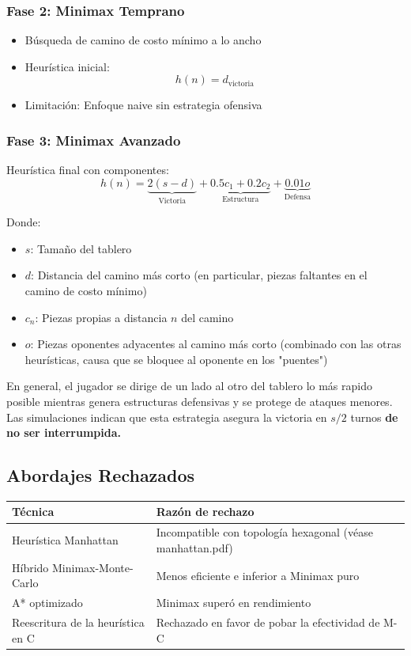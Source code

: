 \documentclass{article}
\begin{document}
\subsubsection*{Fase 2: Minimax Temprano}
\begin{itemize}
\item Búsqueda de camino de costo mínimo a lo ancho
\item Heurística inicial:
\[ h(n) = d_{\text{victoria}} \]
\item Limitación: Enfoque naive sin estrategia ofensiva
\end{itemize}

\subsubsection*{Fase 3: Minimax Avanzado}
Heurística final con componentes:
\[ h(n) = \underbrace{2(s - d)}_{\text{Victoria}} + \underbrace{0.5c_1 + 0.2c_2}_{\text{Estructura}} + \underbrace{0.01o}_{\text{Defensa}} \]

Donde:
\begin{itemize}
\item $s$: Tamaño del tablero
\item $d$: Distancia del camino más corto (en particular, piezas faltantes en el camino de costo mínimo)
\item $c_n$: Piezas propias a distancia $n$ del camino
\item $o$: Piezas oponentes adyacentes al camino más corto (combinado con las otras heurísticas, causa que se bloquee al oponente en los "puentes")
\end{itemize}

En general, el jugador se dirige de un lado al otro del tablero lo más rapido posible mientras genera estructuras defensivas y se protege de ataques menores.
Las simulaciones indican que esta estrategia asegura la victoria en $s/2$ turnos \bfseries{de no ser interrumpida}.

\subsection{Abordajes Rechazados}
\begin{table}[h]
\centering
\begin{tabular}{|l|l|}
\hline
\textbf{Técnica} & \textbf{Razón de rechazo} \\
\hline
Heurística Manhattan & Incompatible con topología hexagonal (véase manhattan.pdf) \\
Híbrido Minimax-Monte-Carlo & Menos eficiente e inferior a Minimax puro\\
A* optimizado & Minimax superó en rendimiento \\
Reescritura de la heurística en C &  Rechazado en favor de pobar la efectividad de M-C\\
\hline
\end{tabular}
\end{table}
\end{document}
